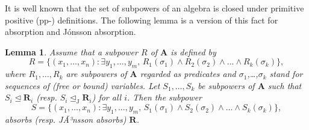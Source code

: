 \documentclass{amsart}
\theoremstyle{plain}
\newtheorem{lemma}[theorem]{Lemma}
\theoremstyle{definition}
\begin{document}
It is well known that the set of subpowers of an algebra is closed under primitive positive (pp-) definitions. 
The following lemma is a version of this fact for absorption and J\'onsson absorption.

\begin{lemma}\label{lemAbsPP}
  Assume that a subpower $R$ of ${{\mathbf{A}}}$ is defined by 
  \[
    R=\{(x_1,\dots,x_n) \colon \exists y_1,\dots,y_m,\, R_1(\sigma_1){\mathop{\wedge}}
    R_2(\sigma_2){\mathop{\wedge}}\dots{\mathop{\wedge}} R_k(\sigma_k)\},
  \]
  where $R_1,\dots,R_k$ are subpowers of ${{\mathbf{A}}}$ regarded as predicates
   and $\sigma_1$,\dots,$\sigma_k$ stand for sequences of (free or bound) variables. 
  Let $S_1,\dots,S_k$ be subpowers of ${{\mathbf{A}}}$ such that $S_i\operatorname{\trianglelefteq} {\mathbf{{R}}}_i$ (resp.
  $S_i\operatorname{\trianglelefteq_J} {\mathbf{{R}}}_i$) for all $i$. Then the subpower
  \[
    S=\{(x_1,\dots,x_n)\colon \exists y_1,\dots,y_m,\, S_1(\sigma_1){\mathop{\wedge}}
    S_2(\sigma_2){\mathop{\wedge}}\dots{\mathop{\wedge}} S_k(\sigma_k)\},
  \]
  absorbs (resp. JÃ³nsson absorbs) ${\mathbf{{R}}}$.
\end{lemma}
\end{document}
